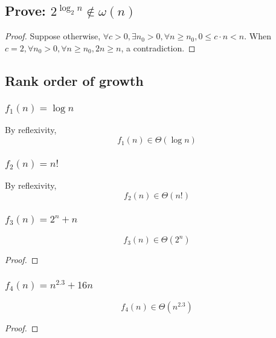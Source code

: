 \documentclass{article}
\begin{document}
\subsection*{Prove: $2^{\log_2n} \notin \omega(n)$}
\begin{proof}
    Suppose otherwise, $\forall c > 0, \exists n_0 > 0, \forall n \geq n_0, 0 \leq c\cdot n < n$. When $c = 2, \forall n_0 > 0, \forall n \geq n_0, 2n \geq n$, a contradiction.
\end{proof}

\subsection*{Rank order of growth}
\subsubsection*{$f_1(n) = \log n$}
By reflexivity, 
\[f_1(n) \in \Theta(\log n)\]
\subsubsection*{$f_2(n) = n!$}
By reflexivity, 
\[f_2(n) \in \Theta(n!)\]
\subsubsection*{$f_3(n) = 2^n + n$}
\[f_3(n) \in \Theta(2^n)\]
\begin{proof}
    
\end{proof}
\subsubsection*{$f_4(n) = n^{2.3} + 16n$}
\[f_4(n) \in \Theta(n^{2.3})\]
\begin{proof}
    
\end{proof}
\end{document}
